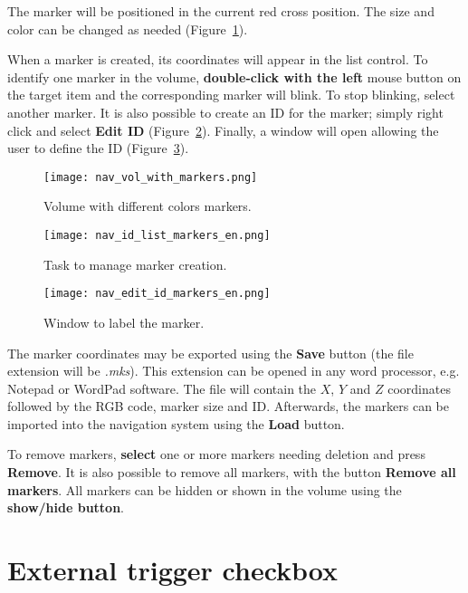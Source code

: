 The marker will be positioned in the current red cross position. The size and color can be changed as needed (Figure~\ref{fig:nav_vol_with_markers}).

When a marker is created, its coordinates will appear in the list control. To identify one marker in the volume, \textbf{double-click with the left} mouse button on the target item and the corresponding marker will blink. To stop blinking, select another marker. It is also possible to create an ID for the marker; simply right click and select \textbf{Edit ID} (Figure~\ref{fig:nav_id_list_markers}). Finally, a window will open allowing the user to define the ID (Figure~\ref{fig:nav_edit_id_markers}).

\begin{figure}[!htb]
\centering
\texttt{[image: nav\_vol\_with\_markers.png]}
\caption{Volume with different colors markers.}
\label{fig:nav_vol_with_markers}
\end{figure} 

\begin{figure}[!htb]
\centering
\texttt{[image: nav\_id\_list\_markers\_en.png]}
\caption{Task to manage marker creation.}
\label{fig:nav_id_list_markers}
\end{figure} 

\begin{figure}[!htb]
\centering
\texttt{[image: nav\_edit\_id\_markers\_en.png]}
\caption{Window to label the marker.}
\label{fig:nav_edit_id_markers}
\end{figure} 

The marker coordinates may be exported using the \textbf{Save} button (the file extension will be \textit{.mks}). This extension can be opened in any word processor, e.g. Notepad or WordPad software. The file will contain the $X$, $Y$ and $Z$ coordinates followed by the RGB code, marker size and ID. Afterwards, the markers can be imported into the navigation system using the \textbf{Load} button.

To remove markers, \textbf{select} one or more markers needing deletion and press \textbf{Remove}. It is also possible to remove all markers, with the button \textbf{Remove all markers}. All markers can be hidden or shown in the volume using the \textbf{show/hide button}.

\section{External trigger checkbox}

